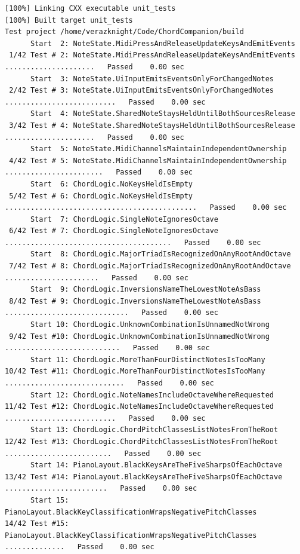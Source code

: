 \documentclass[10pt,letterpaper]{article}
\begin{document}
\begin{lstlisting}[basicstyle=\ttfamily\tiny]
[100%] Linking CXX executable unit_tests
[100%] Built target unit_tests
Test project /home/verazknight/Code/ChordCompanion/build
      Start  2: NoteState.MidiPressAndReleaseUpdateKeysAndEmitEvents
 1/42 Test # 2: NoteState.MidiPressAndReleaseUpdateKeysAndEmitEvents .....................   Passed    0.00 sec
      Start  3: NoteState.UiInputEmitsEventsOnlyForChangedNotes
 2/42 Test # 3: NoteState.UiInputEmitsEventsOnlyForChangedNotes ..........................   Passed    0.00 sec
      Start  4: NoteState.SharedNoteStaysHeldUntilBothSourcesRelease
 3/42 Test # 4: NoteState.SharedNoteStaysHeldUntilBothSourcesRelease .....................   Passed    0.00 sec
      Start  5: NoteState.MidiChannelsMaintainIndependentOwnership
 4/42 Test # 5: NoteState.MidiChannelsMaintainIndependentOwnership .......................   Passed    0.00 sec
      Start  6: ChordLogic.NoKeysHeldIsEmpty
 5/42 Test # 6: ChordLogic.NoKeysHeldIsEmpty .............................................   Passed    0.00 sec
      Start  7: ChordLogic.SingleNoteIgnoresOctave
 6/42 Test # 7: ChordLogic.SingleNoteIgnoresOctave .......................................   Passed    0.00 sec
      Start  8: ChordLogic.MajorTriadIsRecognizedOnAnyRootAndOctave
 7/42 Test # 8: ChordLogic.MajorTriadIsRecognizedOnAnyRootAndOctave ......................   Passed    0.00 sec
      Start  9: ChordLogic.InversionsNameTheLowestNoteAsBass
 8/42 Test # 9: ChordLogic.InversionsNameTheLowestNoteAsBass .............................   Passed    0.00 sec
      Start 10: ChordLogic.UnknownCombinationIsUnnamedNotWrong
 9/42 Test #10: ChordLogic.UnknownCombinationIsUnnamedNotWrong ...........................   Passed    0.00 sec
      Start 11: ChordLogic.MoreThanFourDistinctNotesIsTooMany
10/42 Test #11: ChordLogic.MoreThanFourDistinctNotesIsTooMany ............................   Passed    0.00 sec
      Start 12: ChordLogic.NoteNamesIncludeOctaveWhereRequested
11/42 Test #12: ChordLogic.NoteNamesIncludeOctaveWhereRequested ..........................   Passed    0.00 sec
      Start 13: ChordLogic.ChordPitchClassesListNotesFromTheRoot
12/42 Test #13: ChordLogic.ChordPitchClassesListNotesFromTheRoot .........................   Passed    0.00 sec
      Start 14: PianoLayout.BlackKeysAreTheFiveSharpsOfEachOctave
13/42 Test #14: PianoLayout.BlackKeysAreTheFiveSharpsOfEachOctave ........................   Passed    0.00 sec
      Start 15: PianoLayout.BlackKeyClassificationWrapsNegativePitchClasses
14/42 Test #15: PianoLayout.BlackKeyClassificationWrapsNegativePitchClasses ..............   Passed    0.00 sec

\end{lstlisting}
\end{document}
